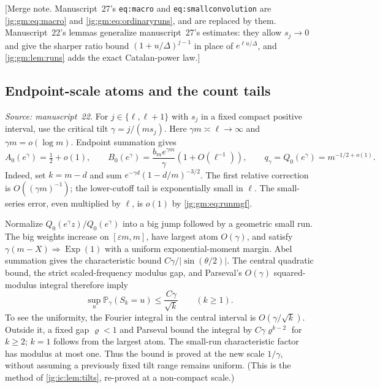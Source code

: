 \documentclass[11pt,a4paper]{article}
\theoremstyle{definition}\newaliascnt{definition}{theorem}
\theoremstyle{remark}\newaliascnt{remark}{theorem}
\newcommand{\ljP}{\mathbb P}
\begin{document}
[Merge note. Manuscript~27's \texttt{eq:macro} and \texttt{eq:smallconvolution}
are \eqref{jg:gm:eq:macro} and \eqref{jg:gm:eq:ordinaryruns}, and are replaced
by them. Manuscript~22's lemmas generalize manuscript~27's estimates: they allow
$s_j\to0$ and give the sharper ratio bound $(1+u/\Delta)^{j-1}$ in place of
$e^{\ell u/\Delta}$, and \cref{jg:gm:lem:runs} adds the exact Catalan-power
law.]

\subsection{Endpoint-scale atoms and the count tails}
\label{jg:sec:gm-tails}
\emph{Source: manuscript~22.} For $j\in\{\ell,\ell+1\}$ with $s_j$ in a fixed
compact positive interval, use the critical tilt $\gamma=j/(ms_j)$. Here
$\gamma m\asymp\ell\to\infty$ and $\gamma m=o(\log m)$. Endpoint summation gives
\begin{equation}\label{jg:gm:eq:tiltscale}
 A_0(e^\gamma)=\tfrac12+o(1),\qquad
 B_0(e^\gamma)=\frac{b_me^{\gamma m}}{\gamma}
                   (1+O(\ell^{-1})),\qquad
 q_\gamma=Q_0(e^\gamma)=m^{-1/2+o(1)}.
\end{equation}
Indeed, set $k=m-d$ and sum $e^{-\gamma d}(1-d/m)^{-3/2}$. The first relative
correction is $O((\gamma m)^{-1})$; the lower-cutoff tail is exponentially
small in $\ell$. The small-series error, even multiplied by $\ell$, is $o(1)$ by
\eqref{jg:gm:eq:runmgf}.

Normalize $Q_0(e^\gamma z)/Q_0(e^\gamma)$ into a big jump followed by a
geometric small run. The big weights increase on $[\varepsilon m,m]$, have
largest atom $O(\gamma)$, and satisfy $\gamma(m-X)\Rightarrow\operatorname{Exp}(1)$
with a uniform exponential-moment margin. Abel summation gives the
characteristic bound $C\gamma/|\sin(\theta/2)|$. The central quadratic bound,
the strict scaled-frequency modulus gap, and Parseval's $O(\gamma)$
squared-modulus integral therefore imply
\begin{equation}\label{jg:gm:eq:atom}
 \sup_u\ljP_\gamma(S_k=u)\le\frac{C\gamma}{\sqrt k}\qquad(k\ge1).
\end{equation}
To see the uniformity, the Fourier integral in the central interval is
$O(\gamma/\sqrt k)$. Outside it, a fixed gap $\varrho<1$ and Parseval bound the
integral by $C\gamma\varrho^{k-2}$ for $k\ge2$; $k=1$ follows from the largest
atom. The small-run characteristic factor has modulus at most one. Thus the
bound is proved at the new scale $1/\gamma$, without assuming a previously fixed
tilt range remains uniform. (This is the method of \cref{jg:ic:lem:tilts},
re-proved at a non-compact scale.)
\end{document}

